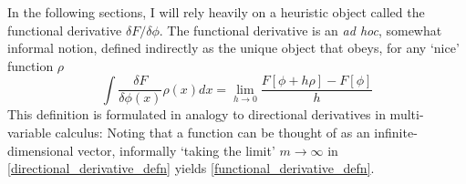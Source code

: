 In the following sections, I will rely heavily on a heuristic object called the functional derivative $\delta F/\delta \phi$. The functional derivative is an \emph{ad hoc}, somewhat informal notion, defined indirectly as the unique object that obeys, for any `nice' function $\rho$
\begin{equation}
\label{functional_derivative_defn}
    \int\frac{\delta F}{\delta \phi(x)}\rho(x)dx = \lim_{h \to 0} \frac{F[\phi + h\rho]-F[\phi]}{h}
\end{equation}
This definition is formulated in analogy to directional derivatives in multi-variable calculus: Noting that a function can be thought of as an infinite-dimensional vector, informally `taking the limit' $m \to \infty$ in \eqref{directional_derivative_defn} yields \eqref{functional_derivative_defn}.

